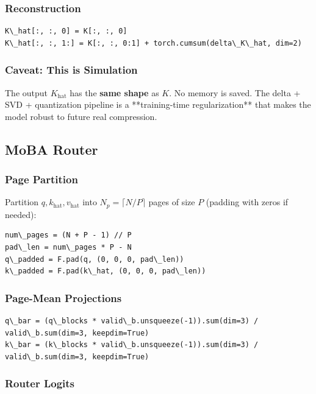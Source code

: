 \subsubsection{Reconstruction}

\begin{lstlisting}
K\_hat[:, :, 0] = K[:, :, 0]
K\_hat[:, :, 1:] = K[:, :, 0:1] + torch.cumsum(delta\_K\_hat, dim=2)
\end{lstlisting}

\subsubsection{Caveat: This is Simulation}

The output $K_\text{hat}$ has the \textbf{same shape} as $K$. No memory is 
saved. The delta + SVD + quantization pipeline is a **training-time 
regularization** that makes the model robust to future real compression.

\subsection{MoBA Router}

\subsubsection{Page Partition}

Partition $q, k_\text{hat}, v_\text{hat}$ into $N_p = \lceil N / P \rceil$ 
pages of size $P$ (padding with zeros if needed):

\begin{lstlisting}
num\_pages = (N + P - 1) // P
pad\_len = num\_pages * P - N
q\_padded = F.pad(q, (0, 0, 0, pad\_len))
k\_padded = F.pad(k\_hat, (0, 0, 0, pad\_len))
\end{lstlisting}

\subsubsection{Page-Mean Projections}

\begin{lstlisting}
q\_bar = (q\_blocks * valid\_b.unsqueeze(-1)).sum(dim=3) / valid\_b.sum(dim=3, keepdim=True)
k\_bar = (k\_blocks * valid\_b.unsqueeze(-1)).sum(dim=3) / valid\_b.sum(dim=3, keepdim=True)
\end{lstlisting}

\subsubsection{Router Logits}

